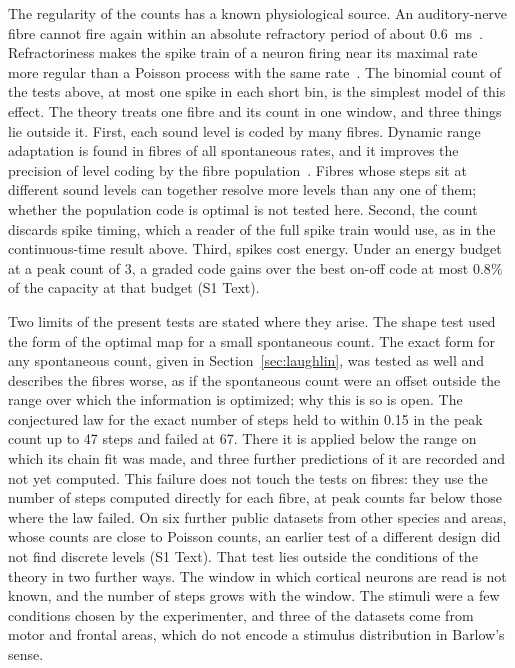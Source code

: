 \documentclass[10pt,letterpaper]{article}
\begin{document}
The regularity of the counts has a known physiological source. An auditory-nerve fibre cannot fire again within an absolute refractory
period of about 0.6~ms~\cite{Heeringa2024}. Refractoriness makes the spike train of a neuron firing near its maximal rate more regular
than a Poisson process with the same rate~\cite{BerryMeister1998}. The binomial count of the tests above, at most one spike in each
short bin, is the simplest model of this effect. The theory treats one fibre and its count in one window, and three things lie outside
it. First, each sound level is coded by many fibres. Dynamic range adaptation is found in fibres of all spontaneous rates, and it
improves the precision of level coding by the fibre population~\cite{Wen2009}. Fibres whose steps sit at different sound levels can
together resolve more levels than any one of them; whether the population code is optimal is not tested here. Second, the count
discards spike timing, which a reader of the full spike train would use, as in the continuous-time result above. Third, spikes cost
energy. Under an energy budget at a peak count of 3, a graded code gains over the best on-off code at most $0.8\%$ of the capacity
at that budget (S1 Text).

Two limits of the present tests are stated where they arise. The shape test used the form of the optimal map for a small spontaneous
count. The exact form for any spontaneous count, given in Section~\ref{sec:laughlin}, was tested as well and describes the fibres
worse, as if the spontaneous count were an offset outside the range over which the information is optimized; why this is so is open. The
conjectured law for the exact number of steps held to within 0.15 in the peak count up to 47 steps and failed at 67. There it is
applied below the range on which its chain fit was made, and three further predictions of it are recorded and not yet computed. This
failure does not touch the tests on fibres: they use the number of steps computed directly for each fibre, at peak counts far below
those where the law failed. On six further public datasets from other species and areas, whose counts are close to Poisson counts, an
earlier test of a different design did not find discrete levels (S1 Text). That test lies outside the conditions of the theory in two
further ways. The window in which cortical neurons are read is not known, and the number of steps grows with the window. The stimuli
were a few conditions chosen by the experimenter, and three of the datasets come from motor and frontal areas, which do not encode
a stimulus distribution in Barlow's sense.
\end{document}

